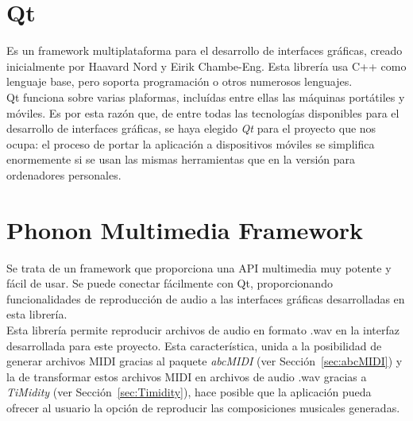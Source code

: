 \section{Qt}
\label{sec:Qt}

Es un framework multiplataforma para el desarrollo de interfaces gráficas, creado inicialmente por Haavard Nord y Eirik Chambe-Eng. Esta librería usa C++ como lenguaje base, pero soporta programación o otros numerosos lenguajes.\\

Qt funciona sobre varias plaformas, incluídas entre ellas las máquinas portátiles y móviles. Es por esta razón que, de entre todas las tecnologías disponibles para el desarrollo de interfaces gráficas, se haya elegido \emph{Qt} para el proyecto que nos ocupa: el proceso de portar la aplicación a dispositivos móviles se simplifica enormemente si se usan las mismas herramientas que en la versión para ordenadores personales.

\section{Phonon Multimedia Framework}
\label{sec:Phonon}

Se trata de un framework que proporciona una API multimedia muy potente y fácil de usar. Se puede conectar fácilmente con Qt, proporcionando funcionalidades de reproducción de audio a las interfaces gráficas desarrolladas en esta librería.\\

Esta librería permite reproducir archivos de audio en formato .wav en la interfaz desarrollada para este proyecto. Esta característica, unida a la posibilidad de generar archivos MIDI gracias al paquete \emph{abcMIDI} (ver Sección~\ref{sec:abcMIDI}) y la de transformar estos archivos MIDI en archivos de audio .wav gracias a \emph{TiMidity} (ver Sección~\ref{sec:Timidity}), hace posible que la aplicación pueda ofrecer al usuario la opción de reproducir las composiciones musicales generadas.